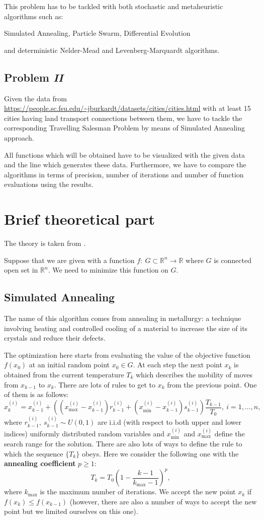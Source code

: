 \documentclass[12pt, bachelor, substylefile = algo_title.rtx]{disser}
\newcommand{\Real}{\mathbb{R}}
\theoremstyle{definition}
\begin{document}
This problem has to be tackled with both stochastic and metaheuristic algorithms such as:
\begin{outline}
\1 Simulated Annealing,
\1 Particle Swarm,
\1 Differential Evolution
\end{outline}
and deterministic Nelder-Mead and Levenberg-Marquardt algorithms.

\subsection{Problem \textit{II}}
Given the data from \url{https://people.sc.fsu.edu/~jburkardt/datasets/cities/cities.html} with at least 15 cities having land transport connections between them, we have to tackle the corresponding Travelling Salesman Problem by means of Simulated Annealing approach.

All functions which will be obtained have to be visualized with the given data and the line which generates these data. Furthermore, we have to compare the algorithms in terms of precision, number of iterations and number of function evaluations using the results.

\section{Brief theoretical part}
The theory is taken from \cite{cavazzuti13}.

Suppose that we are given with a function $f:\ G \subset \Real^n \to \Real$ where $G$ is connected open set in $\Real^n$. We need to minimize this function on $G$.

\subsection{Simulated Annealing}
The name of this algorithm comes from annealing in metallurgy: a technique involving heating and controlled cooling of a material to increase the size of its crystals and reduce their defects.

The optimization here starts from evaluating the value of the objective function $f(x_0)$
at an initial random point $x_0 \in G$. At each step the next point $x_k$ is obtained from the current temperature $T_k$ which describes the mobility of moves from $x_{k-1}$ to $x_k$. There are lots of rules to get to $x_k$ from the previous point. One of them is as follows:
\[ x^{(i)}_{k} = x^{(i)}_{k-1} + \left((x^{(i)}_{\max} - x^{(i)}_{k-1})r^{(i)}_{k-1} + (x^{(i)}_{\min} - x^{(i)}_{k-1})s^{(i)}_{k-1}\right) \frac{T_{k-1}}{T_0},\ i = 1, \dots, n ,\]
where $r^{(i)}_{k-1},\ s^{(i)}_{k-1} \sim U(0, 1)$ are i.i.d (with respect to both upper and lower indices) uniformly distributed random variables and $x^{(i)}_{\min}$ and $x^{(i)}_{\max}$ define the search range for the solution. There are also lots of ways to define the rule to which the sequence $\{T_k\}$ obeys. Here we consider the following one with the \textbf{annealing coefficient} $p \ge 1$:
\[ T_k = T_0 \left(1 - \frac{k - 1}{k_{\max} - 1}\right)^p, \]
where $k_{\max}$ is the maximum number of iterations. We accept the new point $x_k$ if $f(x_k) \le f(x_{k-1})$ (however, there are also a number of ways to accept the new point but we limited ourselves on this one).
\end{document}
